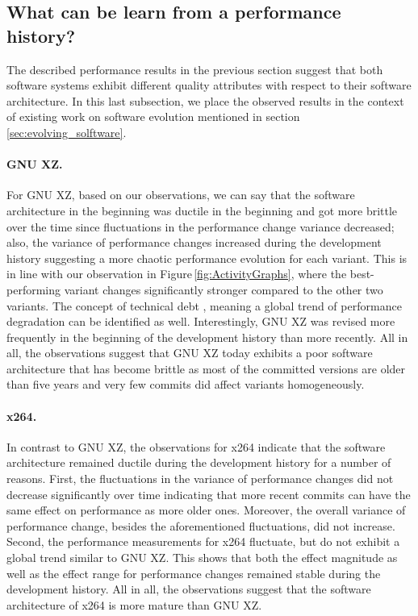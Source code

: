 \subsection{What can be learn from a performance history?}\label{sec:expconc}
The described performance results in the previous section suggest that both
software systems exhibit different quality attributes with respect to their
software architecture. In this last subsection, we place the observed results
in the context of existing work on software evolution mentioned in
section\,\ref{sec:evolving_solftware}.

\paragraph{GNU XZ.} For GNU XZ, based on our observations, we can say that the
software architecture in the beginning was ductile in the beginning and got more brittle
over the time since fluctuations in the performance change variance decreased;
also, the variance of performance changes increased during the development
history suggesting a more chaotic performance evolution for each variant. This
is in line with our observation in Figure\,\ref{fig:ActivityGraphs}, where the
best-performing variant changes significantly stronger compared to the other two variants. The
concept of technical debt \citep{guo_tracking_2011}, meaning a global trend of
performance degradation can be identified as well. Interestingly, GNU XZ was revised
more frequently in the beginning of the development history than more recently.
All in all, the observations suggest that GNU XZ today exhibits a poor software
architecture that has become brittle as most of the committed versions are
older than five years and very few commits did affect variants homogeneously.

\paragraph{x264.} In contrast to GNU XZ, the observations for x264 indicate that
the software architecture remained ductile during the development history for a number of
reasons. First, the fluctuations in the variance of performance changes did not
decrease significantly over time indicating that more recent commits can have
the same effect on performance as more older ones. Moreover, the overall
variance of performance change, besides the aforementioned fluctuations, did
not increase. Second, the performance measurements for x264 fluctuate, but do
not exhibit a global trend similar to GNU XZ. This shows that both the effect
magnitude as well as the effect range for performance changes remained stable
during the development history. All in all, the observations suggest that the software architecture of x264 is
more mature than GNU XZ.

